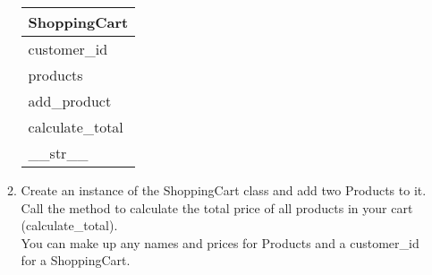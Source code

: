 \documentclass{article}
\begin{document}
\begin{enumerate}
\begin{enumerate}
			\begin{flushright}
			\begin{tabular}{|l|}
				\hline
				ShoppingCart\\ \hline  	%
				customer\_id \\ products\\ \hline		%
				add\_product \\ calculate\_total \\ \_\_str\_\_ \\ \hline		%
			\end{tabular}
			\end{flushright}

		\item
			Create an instance of the ShoppingCart class and add two Products to it.\\
			Call the method to calculate the total price of all products in your cart (calculate\_total).\\
			You can make up any names and prices for Products and a customer\_id for a ShoppingCart.\\
	\end{enumerate}
\pagebreak




\end{enumerate}
\pagebreak
\end{document}
